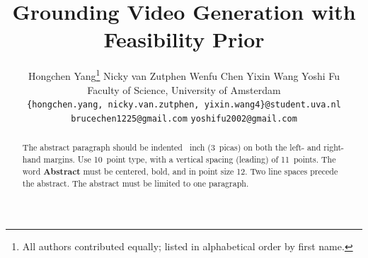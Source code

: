 \documentclass{article}
\title{Grounding Video Generation with Feasibility Prior}
\author{%
  Hongchen Yang\thanks{All authors contributed equally; listed in alphabetical order by first name.} \quad
  Nicky van Zutphen \quad Wenfu Chen \quad Yixin Wang \quad Yoshi Fu \\
  Faculty of Science, University of Amsterdam \\
  \texttt{\{hongchen.yang, nicky.van.zutphen, yixin.wang4\}@student.uva.nl} \\
  \texttt{brucechen1225@gmail.com} \quad
  \texttt{yoshifu2002@gmail.com}
}
\begin{document}
\maketitle

\begin{abstract}
  The abstract paragraph should be indented ~inch (3~picas) on both the left- and right-hand margins. Use 10~point type, with a vertical spacing (leading) of 11~points. The word \textbf{Abstract} must be centered, bold, and in point size 12. Two line spaces precede the abstract. The abstract must be limited to one paragraph.
\end{abstract}










\newpage



\clearpage

\end{document}
